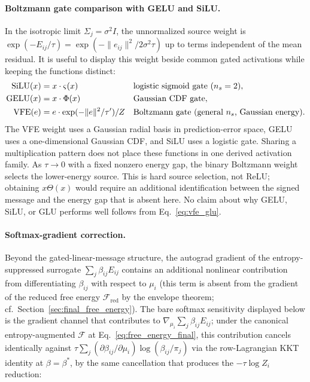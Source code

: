 \documentclass[twoside,11pt]{article}
\begin{document}
\paragraph{Boltzmann gate comparison with GELU and SiLU.}

In the isotropic limit $\Sigma_j = \sigma^2 I$, the unnormalized source weight is $\exp(-E_{ij}/\tau) = \exp(-\|e_{ij}\|^2 / 2\sigma^2\tau)$ up to terms independent of the mean residual. It is useful to display this weight beside common gated activations while keeping the functions distinct:
%
\begin{align}
\text{SiLU}(x) &= x \cdot \varsigma(x) && \text{logistic sigmoid gate ($n_s = 2$)}, \notag \\
\text{GELU}(x) &= x \cdot \Phi(x) && \text{Gaussian CDF gate}, \label{eq:activation_comparison} \\
\text{VFE}(e) &= e \cdot \exp(-\|e\|^2/\tau')/Z && \text{Boltzmann gate (general $n_s$, Gaussian energy)}. \notag
\end{align}
%
The VFE weight uses a Gaussian radial basis in prediction-error space, GELU uses a one-dimensional Gaussian CDF, and SiLU uses a logistic gate. Sharing a multiplication pattern does not place these functions in one derived activation family. As $\tau\to0$ with a fixed nonzero energy gap, the binary Boltzmann weight selects the lower-energy source. This is hard source selection, not ReLU; obtaining $x\Theta(x)$ would require an additional identification between the signed message and the energy gap that is absent here. No claim about why GELU, SiLU, or GLU performs well follows from Eq.~\eqref{eq:vfe_glu}.

\paragraph{Softmax-gradient correction.}

Beyond the gated-linear-message structure, the autograd gradient of the entropy-suppressed surrogate $\sum_j \beta_{ij} E_{ij}$ contains an additional nonlinear contribution from differentiating $\beta_{ij}$ with respect to $\mu_i$ (this term is absent from the gradient of the reduced free energy $\mathcal{F}_{\mathrm{red}}$ by the envelope theorem; cf.\ Section~\ref{sec:final_free_energy}). The bare softmax sensitivity displayed below is the gradient channel that contributes to $\nabla_{\mu_i} \sum_j \beta_{ij} E_{ij}$; under the canonical entropy-augmented $\mathcal{F}$ at Eq.~\eqref{eq:free_energy_final}, this contribution cancels identically against $\tau \sum_j (\partial\beta_{ij}/\partial\mu_i) \log(\beta_{ij}/\pi_j)$ via the row-Lagrangian KKT identity at $\beta = \beta^*$, by the same cancellation that produces the $-\tau\log Z_i$ reduction:
\end{document}
